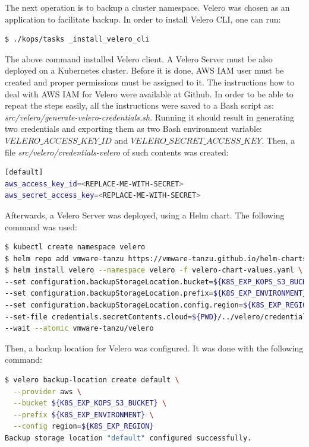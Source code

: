 The next operation is to backup a cluster namespace. Velero was chosen as an application to facilitate backup. In order to install Velero CLI, one can run:
\begin{lstlisting}[basicstyle=\tiny,caption={TODO},captionpos=b,language=Bash,xleftmargin=1cm]
$ ./kops/tasks _install_velero_cli
\end{lstlisting}

The above command installed Velero client. A Velero Server must be also deployed on a Kubernetes cluster. Before it is done, AWS IAM user must be created and proper permissions must be assigned to it. The instructions how to deal with AWS IAM for Velero were available at Github\cite{velero-aws-plugin}. In order to be able to repeat the steps easily, all the instructions were saved to a Bash script as: \textit{src/velero/generate-velero-credentials.sh}. Running it should result in generating two credentials and exporting them as two Bash environment variable: \textit{$VELERO\_ACCESS\_KEY\_ID$} and \textit{$VELERO\_SECRET\_ACCESS\_KEY$}. Then, a file \textit{src/velero/credentials-velero} of such contents was created:
\begin{lstlisting}[basicstyle=\tiny,caption={TODO},captionpos=b,language=Bash,xleftmargin=1cm]
[default]
aws_access_key_id=<REPLACE-ME-WITH-SECRET>
aws_secret_access_key=<REPLACE-ME-WITH-SECRET>
\end{lstlisting}

Afterwards, a Velero Server was deployed, using a Helm chart. The following command was used:

\begin{lstlisting}[basicstyle=\tiny,caption={TODO},captionpos=b,language=Bash,xleftmargin=1cm]
$ kubectl create namespace velero
$ helm repo add vmware-tanzu https://vmware-tanzu.github.io/helm-charts
$ helm install velero --namespace velero -f velero-chart-values.yaml \
--set configuration.backupStorageLocation.bucket=${K8S_EXP_KOPS_S3_BUCKET} \
--set configuration.backupStorageLocation.prefix=${K8S_EXP_ENVIRONMENT} \
--set configuration.backupStorageLocation.config.region=${K8S_EXP_REGION} \
--set-file credentials.secretContents.cloud=${PWD}/../velero/credentials-velero \
--wait --atomic vmware-tanzu/velero
\end{lstlisting}

Then, a backup location for Velero was configured. It was done with the following command:
\begin{lstlisting}[basicstyle=\tiny,caption={TODO},captionpos=b,language=Bash,xleftmargin=1cm]
$ velero backup-location create default \
  --provider aws \
  --bucket ${K8S_EXP_KOPS_S3_BUCKET} \
  --prefix ${K8S_EXP_ENVIRONMENT} \
  --config region=${K8S_EXP_REGION}
Backup storage location "default" configured successfully.
\end{lstlisting}

